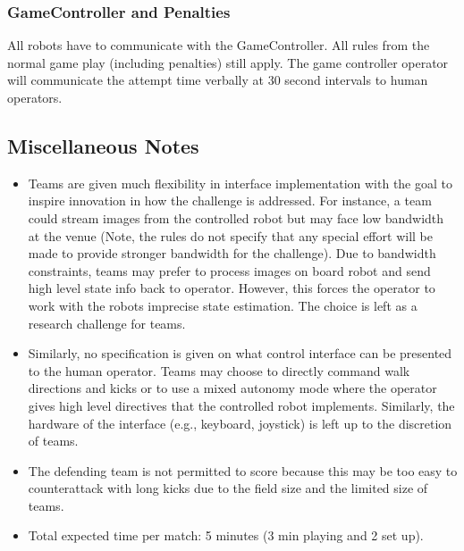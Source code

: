 \subsubsection{GameController and Penalties}
All robots have to communicate with the GameController. All rules from the normal game play (including penalties) still apply. The game controller operator will communicate the attempt time verbally at 30 second intervals to human operators.

\subsection{Miscellaneous Notes}

\begin{itemize}
\item Teams are given much flexibility in interface implementation with the goal to inspire innovation in how the challenge is addressed. For instance, a team could stream images from the controlled robot but may face low bandwidth at the venue  (Note, the rules do not specify that any special effort will be made to provide stronger bandwidth for the challenge). Due to bandwidth constraints, teams may prefer to process images on board robot and send high level state info back to operator. However, this forces the operator to work with the robots imprecise state estimation. The choice is left as a research challenge for teams.
\item Similarly, no specification is given on what control interface can be presented to the human operator. Teams may choose to directly command walk directions and kicks or to use a mixed autonomy mode where the operator gives high level directives that the controlled robot implements. Similarly, the hardware of the interface (e.g., keyboard, joystick) is left up to the discretion of teams.
\item The defending team is not permitted to score because this may be too easy to counterattack with long kicks due to the field size and the limited size of teams.
\item Total expected time per match: 5 minutes (3 min playing and 2 set up). 
\end{itemize}

